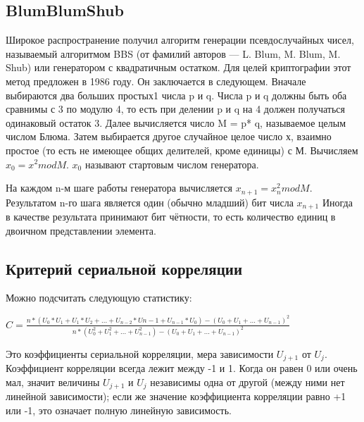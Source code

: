 \subsection{BlumBlumShub}
Широкое распространение получил алгоритм генерации псевдослучайных чисел, называемый алгоритмом BBS (от фамилий авторов — L. Blum, M. Blum, M. Shub) или генератором с квадратичным остатком. 
Для целей криптографии этот метод предложен в 1986 году.
Он заключается в следующем. Вначале выбираются два больших простых1 числа p и q. 
Числа p и q должны быть оба сравнимы с 3 по модулю 4, то есть при делении p и q на 4 должен получаться одинаковый остаток 3. 
Далее вычисляется число M = p* q, называемое целым числом Блюма. Затем выбирается другое случайное целое число х, взаимно простое (то есть не имеющее общих делителей, кроме единицы) с М. Вычисляем $ x_0 = x^2 mod M$. $x_0$ называют стартовым числом генератора.

На каждом n-м шаге работы генератора вычисляется $x_{n+1} = x_n^2 mod M$. Результатом n-го шага является один (обычно младший) бит числа $x_{n + 1}$
Иногда в качестве результата принимают бит чётности, то есть количество единиц в двоичном представлении элемента.

\subsection{Критерий сериальной корреляции}
Можно подсчитать следующую статистику:


$C = \frac{n * (U_0 * U_1 + U_1 * U_2 + ... + U_{n-2} * U{n - 1} + U_{n - 1} * U_0) - (U_0 + U_1 + ... + U_{n-1})^2}
{n * (U_0^2 + U_1^2 + ... + U_{n-1}^2) - (U_0 + U_1 + ... + U_{n-1})^2}$


Это коэффициенты сериальной корреляции, мера зависимости $ U_{j+1} $ от $ U_j $. Коэффициент корреляции всегда лежит между -1 и 1. Когда он равен 0 или очень мал, значит величины $U_{j+1}$ и $U_j$ независимы одна от другой (между ними нет линейной зависимости); если же значение коэффициента корреляции равно +1 или -1, это означает полную линейную зависимость.